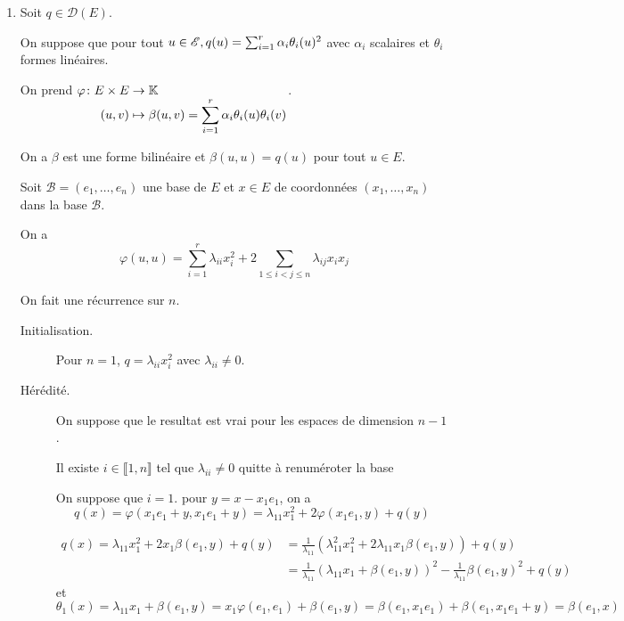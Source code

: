 \documentclass[a4paper,12pt]{article}
\begin{document}
\begin{demonstration}
    \begin{enumerate}
        \item
        Soit $q \in \mathcal{D}(E)$.

        On suppose que pour tout $u \in \mathscr{E}, q(u) = \sum_{i=1}^r \alpha_i \theta_i(u)^2$ avec $\alpha_i$ scalaires et $\theta_i$ formes linéaires.

        On prend $\funcdef{\varphi}{E \times E}{\K}{(u, v)}{\beta(u, v) = \sum_{i=1}^r \alpha_i \theta_i(u) \theta_i(v)}$.

        On a $\beta$ est une forme bilinéaire et $\beta(u, u) = q(u)$ pour tout $u \in E$.

        Soit $\mathcal{B} = (e_1, \ldots, e_n)$ une base de $E$ et $x \in E$ de coordonnées $(x_1, \ldots, x_n)$ dans la base $\mathcal{B}$.

        On a
        $$
        \varphi(u, u) = \sum_{i=1}^r \lambda_{ii} x_i^2 + 2 \sum_{1 \leq i < j \leq n} \lambda_{ij} x_i x_j
        $$

        On fait une récurrence sur $n$.
        \begin{description}
            \item[Initialisation.]
            Pour $n = 1$, $q = \lambda_{ii} x_i^2$ avec $\lambda_{ii} \neq 0$.
            \item[Hérédité.]  
            On suppose que le resultat est vrai pour les espaces de dimension $n-1$.

            Il existe $i \in \llbracket 1, n \rrbracket$ tel que $\lambda_{ii} \neq 0$ quitte à renuméroter la base

            On suppose que $i = 1$. pour $y = x - x_1 e_1$, on a
            $$
            q(x) = \varphi(x_1 e_1 + y, x_1 e_1 + y) = \lambda_{11} x_1^2 + 2 \varphi(x_1 e_1, y) + q(y)
            $$

            \begin{align*}
                q(x) = \lambda_{11} x_1^2 + 2 x_1 \beta(e_1, y) + q(y) &= \frac{1}{\lambda_{11}} \left( \lambda_{11}^2 x_1^2 + 2 \lambda_{11} x_1 \beta(e_1, y) \right) + q(y) \\
                &= \frac{1}{\lambda_{11}} \left( \lambda_{11} x_1 + \beta(e_1, y) \right)^2 - \frac{1}{\lambda_{11}} \beta(e_1, y)^2 + q(y)
            \end{align*}
            et
            $$
            \theta_1(x) = \lambda_{11} x_1 + \beta(e_1, y) = x_1 \varphi(e_1, e_1) + \beta(e_1, y) = \beta(e_1, x_1 e_1) + \beta(e_1, x_1e_1 + y) = \beta(e_1, x)
            $$


\end{description}
\end{enumerate}
\end{demonstration}
\end{document}
